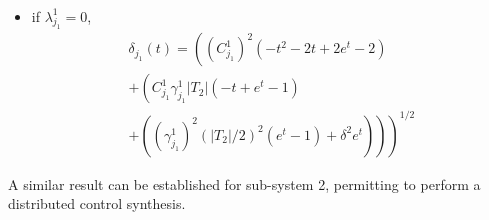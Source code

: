 \begin{theorem}
\begin{itemize}
\begin{multline}
  \end{multline}
\item if $\lambda^1_{j_1} = 0$,
  \begin{multline}
    \delta_{j_1} (t) =
    \left( {(C_{j_1}^1)^2} \left( -  t^2 - 2  t + 2 e^{ t} - 2 \right) \right.   \\
    + \left.  \left( {C_{j_1}^1 \gamma^1_{j_1} |T_2|} \left( -  t + e^{ t} -1 \right) \right. \right.  \\ + \left. \left.  \left({(\gamma^1_{j_1}) ^2 (|T_2 |/2)^2} ( e^{ t } - 1) +  \delta^2 e^{ t}  \right) \right)  \right)^{1/2}
  \end{multline}
\end{itemize}
\end{theorem}

A similar result can be established for sub-system 2, permitting to perform
a distributed control synthesis.

